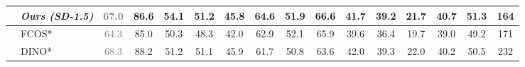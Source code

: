 \begin{table}[h]
{\begin{tabular}{l|l|c|ccc|c|ccc|cccc|>{}c|>{}c}
    & \textit{\textbf{Ours\footnotesize{ \textit{(SD-1.5)}}}} & \textcolor{gray}{\textbf{67.0}} & \textbf{86.6} & \textbf{54.1} & \textbf{51.2} & \textbf{45.8} & \textbf{64.6} & \textbf{51.9} & \textbf{66.6} & \textbf{41.7} & \textbf{39.2} & \textbf{21.7} & \textbf{40.7} & \textbf{51.3} & 164 \\
    \midrule
    & FCOS*~\cite{fcos} & \textcolor{gray}{64.3} & 85.0 & 50.3 & 48.3 & 42.0 & 62.9 & 52.1 & 65.9 & 39.6 & 36.4 & 19.7 & 39.0 & 49.2 & 171 \\
    & DINO*~\cite{dino_detector} & \textcolor{gray}{68.3} & 88.2 & 51.2 & 51.1 & 45.9 & 61.7 & 50.8 & 63.6 & 42.0 & 39.3 & 22.0 & 40.2 & 50.5 & 232 \\
    \bottomrule
    \end{tabular}%
    }
\end{table}

